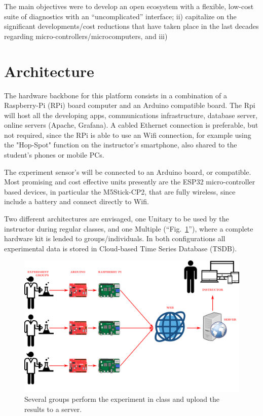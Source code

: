 \documentclass[conference]{IEEEtran}
\begin{document}
The main objectives were to develop an open ecosystem with a flexible, low-cost suite of diagnostics with an ``uncomplicated'' interface; ii) capitalize on the significant developments/cost reductions that have taken place in the last decades regarding micro-controllers/microcomputers, and iii)

\section{Architecture}
The hardware backbone for this platform consists in a combination of a Raspberry-Pi (RPi) board computer and an Arduino compatible board. 
The Rpi will host all the developing  apps, communications infrastructure, database server, online servers (Apache, Grafana). 
 A cabled Ethernet connection is preferable, but not  required, since the RPi is able to use an Wifi connection, 
 for example using the "Hop-Spot" function on the instructor’s smartphone, also shared to the student’s phones or mobile PCs.

 The experiment sensor's will be connected to an Arduino board, or compatible.
 Most promising and cost effective units presently are the ESP32 micro-controller based devices, in particular the M5Stick-CP2,
 that are fully wireless, since include a battery and connect directly to Wifi.

 Two different architectures are envisaged, one Unitary to be used by the instructor during regular classes, and one Multiple (``Fig.~\ref{figMultiple}''),
 where a complete hardware kit is lended to groups/individuals. 
 In both configurations all experimental data is stored in Cloud-based Time Series Database\cite{b3} (TSDB).
 
\begin{figure}[htbp]
\centerline{\includegraphics[width=.6\columnwidth]{Multiple.png}}
\caption{Several groups perform the experiment in class and upload the results to a server.}
\label{figMultiple}
\end{figure}
\end{document}
